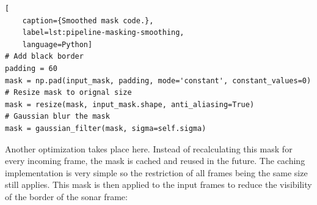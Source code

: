 \begin{lstlisting}[
    caption={Smoothed mask code.},
    label=lst:pipeline-masking-smoothing,
    language=Python]
# Add black border
padding = 60
mask = np.pad(input_mask, padding, mode='constant', constant_values=0)
# Resize mask to orignal size
mask = resize(mask, input_mask.shape, anti_aliasing=True)
# Gaussian blur the mask
mask = gaussian_filter(mask, sigma=self.sigma)
\end{lstlisting}

Another optimization takes place here. Instead of recalculating this mask for every incoming frame, the mask is cached and reused in the future. The caching implementation is very simple so the restriction of all frames being the same size still applies. This mask is then applied to the input frames to reduce the visibility of the border of the sonar frame:

